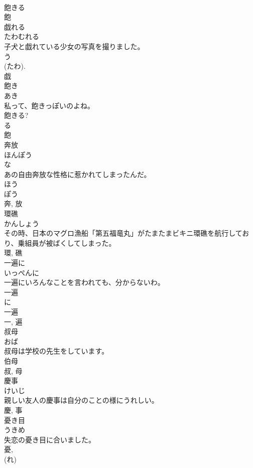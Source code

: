 \documentclass[8pt]{extreport}
\begin{document}
\begin{CJK}{UTF8}{min}
\\	飽きる 
\\	飽	
\\	戯れる	
\\	たわむれる	
\\	子犬と戯れている少女の写真を撮りました。	
\\	う 
\\	(たわ). 
\\	戯	
\\	飽き	
\\	あき	
\\	私って、飽きっぽいのよね。	
\\	飽きる? 
\\	る 
\\	飽	
\\	奔放	
\\	ほんぽう	
\\	な 
\\	あの自由奔放な性格に惹かれてしまったんだ。	
\\	ほう 
\\	ぽう 
\\	奔, 放	
\\	環礁	
\\	かんしょう	
\\	その時、日本のマグロ漁船「第五福竜丸」がたまたまビキニ環礁を航行しており、乗組員が被ばくしてしまった。	
\\	環, 礁	
\\	一遍に	
\\	いっぺんに	
\\	一遍にいろんなことを言われても、分からないわ。	
\\	一遍 
\\	に 
\\	一遍 
\\	一, 遍	
\\	叔母	
\\	おば	
\\	叔母は学校の先生をしています。	
\\	伯母 
\\	叔, 母	
\\	慶事	
\\	けいじ	
\\	親しい友人の慶事は自分のことの様にうれしい。	
\\	慶, 事	
\\	憂き目	
\\	うきめ	
\\	失恋の憂き目に合いました。	
\\	憂, 
\\	(れ) 

\end{CJK}
\end{document}
